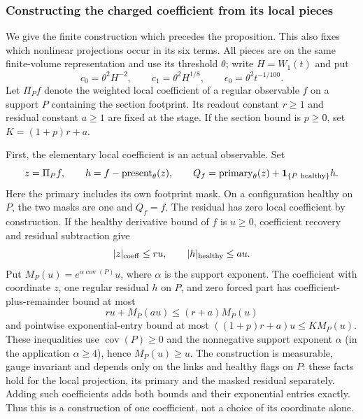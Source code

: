 \subsubsection{Constructing the charged coefficient from its local pieces}
\label{subsec:trace-charge-construction}

We give the finite construction which precedes the proposition. This also
fixes which nonlinear projections occur in its six terms. All pieces are
on the same finite-volume representation and use its threshold $\theta$;
write $H=W_1(t)$ and put
\[
 c_0=\theta^2H^{-2},\qquad c_1=\theta^2H^{1/8},\qquad
 \epsilon_0=\theta^2t^{-1/100}.
\]
Let $\Pi_P f$ denote the weighted local coefficient of a regular observable
$f$ on a support $P$ containing the section footprint. Its readout constant
$r\ge1$ and residual constant $a\ge1$ are fixed at the stage. If the
section bound is $p\ge0$, set $K=(1+p)r+a$.

First, the elementary local coefficient is an actual observable. Set
\[
 z=\Pi_P f,\qquad h=f-\operatorname{present}_\theta(z),\qquad
 Q_f=\operatorname{primary}_\theta(z)+{\bf1}_{\{P\ \mathrm{healthy}\}}h.
\]
Here the primary includes its own footprint mask. On a configuration
healthy on $P$, the two masks are one and $Q_f=f$. The residual has zero
local coefficient by construction. If the healthy derivative bound of $f$
is $u\ge0$, coefficient recovery and residual subtraction give
\[
 |z|_{\rm coeff}\le ru,\qquad
 |h|_{\rm healthy}\le au.
\]
Put $M_P(u)=e^{\alpha\operatorname{cov}(P)}u$, where $\alpha$ is the
support exponent. The coefficient with coordinate $z$, one regular
residual $h$ on $P$, and zero forced part has coefficient-plus-remainder
bound at most
\[
 ru+M_P(au)\le (r+a)M_P(u)
\]
and pointwise exponential-entry bound at most
$((1+p)r+a)u\le K M_P(u)$. These inequalities use
$\operatorname{cov}(P)\ge0$ and the nonnegative support exponent
$\alpha$ (in the application $\alpha\ge4$), hence $M_P(u)\ge u$.
The construction is measurable, gauge invariant and depends only on the
links and healthy flags on $P$: these facts hold for the local projection,
its primary and the masked residual separately. Adding such coefficients
adds both bounds and their exponential entries exactly. Thus this is a
construction of one coefficient, not a choice of its coordinate alone.

